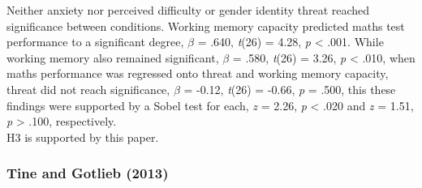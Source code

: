 \documentclass[
  stu,floatsintext]{apa7}
\begin{document}
Neither anxiety nor perceived difficulty or gender identity threat reached significance between conditions.
Working memory capacity predicted maths test performance to a significant degree, \(\beta\) = .640, \emph{t}(26) = 4.28, \emph{p} \textless{} .001.
While working memory also remained significant, \(\beta\) = .580, \emph{t}(26) = 3.26, \emph{p} \textless{} .010, when maths performance was regressed onto threat and working memory capacity, threat did not reach significance, \(\beta\) = -0.12, \emph{t}(26) = -0.66, \emph{p} = .500, this these findings were supported by a Sobel test for each, \emph{z} = 2.26, \emph{p} \textless{} .020 and \emph{z} = 1.51, \emph{p} \textgreater{} .100, respectively.\\
H3 is supported by this paper.

\subsubsection{Tine and Gotlieb (2013)}\label{tinegenderraceincomebased2013}
\end{document}
